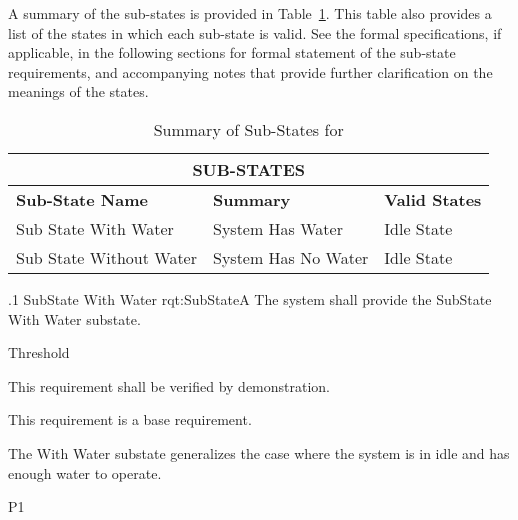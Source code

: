 A summary of the sub-states is provided in Table~\ref{tab:SubStates}.
This table also provides a list of the states in which each sub-state is valid.
See the formal specifications, if applicable, in the following sections for formal statement of the sub-state requirements, and accompanying notes that provide further clarification on the meanings of the states.
\begin{table}[h]
	\begin{center}
		\begin{tabular}{|p{1.0in}|p{4.0in}|p{1.0in}|}
			\hline
			\hline
			\multicolumn{3}{|c|}{{\bf SUB-STATES}} \\
			\hline
				{\bf Sub-State Name} & {\bf Summary} & {\bf Valid States} \\ 
			\hline
			\hline
Sub State With Water & System Has Water & Idle State \\ \hline
Sub State Without Water & System Has No Water & Idle State \\ 
			\hline
			\hline
		\end{tabular}
		\caption{Summary of Sub-States for \ThisSystem}
		\label{tab:SubStates}
	\end{center}
\end{table}


\ONERQMTV
{\RqtNumberBase.1}
{SubState With Water}
{rqt:SubStateA}
{The system shall provide the SubState With Water substate.}
{
	\item [Phase 1] Threshold
}
{This requirement shall be verified by demonstration.}
{
	\item [N/A] This requirement is a base requirement.
}
{
	\item The With Water substate generalizes the case where the system is in idle and has enough water to operate.
}
{P1}

